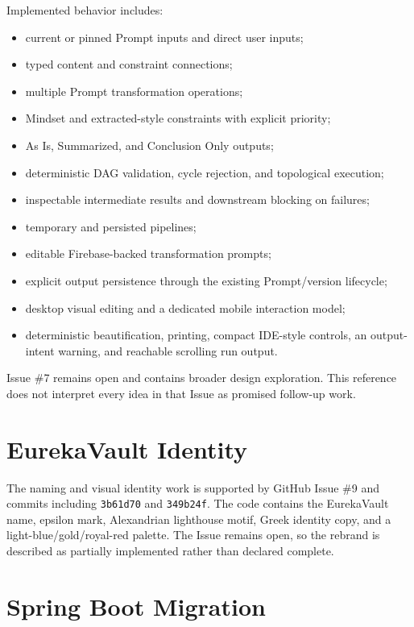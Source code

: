 \documentclass[11pt]{article}
\newcommand{\commit}[1]{\texttt{#1}}
\begin{document}
Implemented behavior includes:

\begin{itemize}
  \item current or pinned Prompt inputs and direct user inputs;
  \item typed content and constraint connections;
  \item multiple Prompt transformation operations;
  \item Mindset and extracted-style constraints with explicit priority;
  \item As Is, Summarized, and Conclusion Only outputs;
  \item deterministic DAG validation, cycle rejection, and topological execution;
  \item inspectable intermediate results and downstream blocking on failures;
  \item temporary and persisted pipelines;
  \item editable Firebase-backed transformation prompts;
  \item explicit output persistence through the existing Prompt/version lifecycle;
  \item desktop visual editing and a dedicated mobile interaction model;
  \item deterministic beautification, printing, compact IDE-style controls, an
        output-intent warning, and reachable scrolling run output.
\end{itemize}

Issue \#7 remains open and contains broader design exploration. This reference
does not interpret every idea in that Issue as promised follow-up work.

\section{EurekaVault Identity}

The naming and visual identity work is supported by GitHub Issue \#9 and commits
including \commit{3b61d70} and \commit{349b24f}. The code contains the
EurekaVault name, epsilon mark, Alexandrian lighthouse motif, Greek identity copy,
and a light-blue/gold/royal-red palette. The Issue remains open, so the rebrand is
described as partially implemented rather than declared complete.

\section{Spring Boot Migration}
\end{document}
